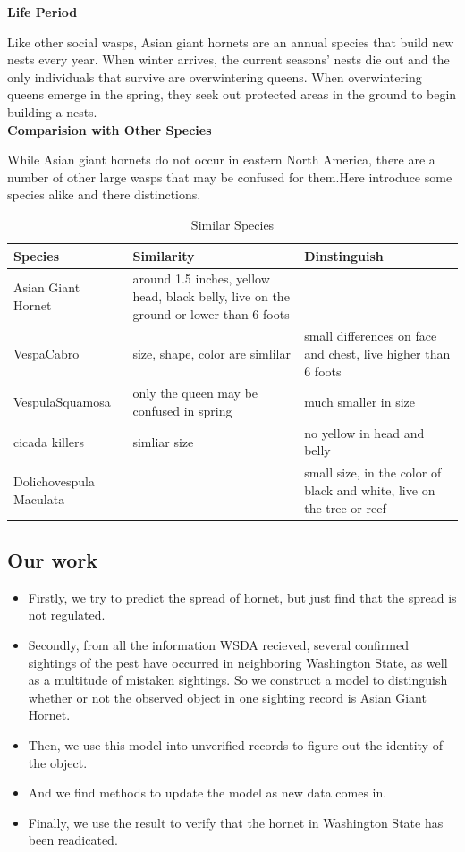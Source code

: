 \documentclass[12pt]{article}
\begin{document}
\textbf{Life Period}

 Like other social wasps, Asian giant hornets are an annual species that build new nests every year. When winter arrives, the current seasons' nests die out and the only individuals that survive are overwintering queens. When overwintering queens emerge in the spring, they seek out protected areas in the ground to begin building a nests.
\quad\\
 
\textbf{Comparision with Other Species}

While Asian giant hornets do not occur in eastern North America, there are a number of other large wasps that may be confused for them.Here introduce some species alike and there distinctions.
\begin{table}  
	\caption{Similar Species}  
	\begin{center}  
		\begin{tabular}{|p{5cm}<{\centering}|p{7cm}<{\centering}| p{5cm}<{\centering}|}  
			\hline  
			Species & Similarity & Dinstinguish  \\ \hline  
			Asian Giant Hornet& around 1.5 inches, yellow head, black belly, live on the ground or lower than 6 foots&\\ \hline  
			VespaCabro & size, shape, color are simlilar &small differences on face and chest, live higher than 6 foots \\  
			\hline 
			VespulaSquamosa & only the queen may be confused in spring  &much smaller in size \\  
			\hline  
			cicada killers & simliar size  &no yellow in head and belly \\  
			\hline
			Dolichovespula Maculata &  &small size, in the color of black and white, live on the tree or reef\\  
			\hline
		\end{tabular}  
	\end{center}  
\end{table}




\subsection{Our work}
\begin{itemize}
	\item Firstly, we try to predict the spread of hornet, but just find that the spread is not regulated.
	\item Secondly, from all the information WSDA recieved, several confirmed sightings of the pest have occurred in neighboring Washington State, as well as a multitude of mistaken sightings. So we construct a model to distinguish whether or not the observed object in one sighting record is Asian Giant Hornet.
	\item Then, we use this model into unverified records to figure out the identity of the object.
	\item And we find methods to update the model as new data comes in.
	\item Finally, we use the result to verify that the hornet in Washington State has been readicated.
\end{itemize}
\end{document}
